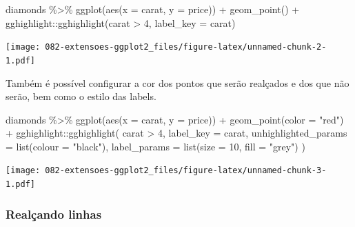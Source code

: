 \documentclass[
]{book}
\newenvironment{Shaded}{\begin{snugshade}}{\end{snugshade}}
\newcommand{\AttributeTok}[1]{\textcolor[rgb]{0.77,0.63,0.00}{#1}}
\newcommand{\DecValTok}[1]{\textcolor[rgb]{0.00,0.00,0.81}{#1}}
\newcommand{\FunctionTok}[1]{\textcolor[rgb]{0.00,0.00,0.00}{#1}}
\newcommand{\NormalTok}[1]{#1}
\newcommand{\SpecialCharTok}[1]{\textcolor[rgb]{0.00,0.00,0.00}{#1}}
\newcommand{\StringTok}[1]{\textcolor[rgb]{0.31,0.60,0.02}{#1}}
\begin{document}
\begin{Shaded}
\begin{Highlighting}[]
\NormalTok{diamonds }\SpecialCharTok{\%\textgreater{}\%} 
  \FunctionTok{ggplot}\NormalTok{(}\FunctionTok{aes}\NormalTok{(}\AttributeTok{x =}\NormalTok{ carat, }\AttributeTok{y =}\NormalTok{ price)) }\SpecialCharTok{+}
  \FunctionTok{geom\_point}\NormalTok{() }\SpecialCharTok{+}
\NormalTok{  gghighlight}\SpecialCharTok{::}\FunctionTok{gghighlight}\NormalTok{(carat }\SpecialCharTok{\textgreater{}} \DecValTok{4}\NormalTok{, }\AttributeTok{label\_key =}\NormalTok{ carat)}
\end{Highlighting}
\end{Shaded}

\texttt{[image: 082-extensoes-ggplot2\_files/figure-latex/unnamed-chunk-2-1.pdf]}

Também é possível configurar a cor dos pontos que serão realçados e dos que não serão, bem como o estilo das labels.

\begin{Shaded}
\begin{Highlighting}[]
\NormalTok{diamonds }\SpecialCharTok{\%\textgreater{}\%} 
  \FunctionTok{ggplot}\NormalTok{(}\FunctionTok{aes}\NormalTok{(}\AttributeTok{x =}\NormalTok{ carat, }\AttributeTok{y =}\NormalTok{ price)) }\SpecialCharTok{+}
  \FunctionTok{geom\_point}\NormalTok{(}\AttributeTok{color =} \StringTok{"red"}\NormalTok{) }\SpecialCharTok{+}
\NormalTok{  gghighlight}\SpecialCharTok{::}\FunctionTok{gghighlight}\NormalTok{(}
\NormalTok{    carat }\SpecialCharTok{\textgreater{}} \DecValTok{4}\NormalTok{, }
    \AttributeTok{label\_key =}\NormalTok{ carat,}
    \AttributeTok{unhighlighted\_params =} \FunctionTok{list}\NormalTok{(}\AttributeTok{colour =} \StringTok{"black"}\NormalTok{),}
    \AttributeTok{label\_params =} \FunctionTok{list}\NormalTok{(}\AttributeTok{size =} \DecValTok{10}\NormalTok{, }\AttributeTok{fill =} \StringTok{"grey"}\NormalTok{)}
\NormalTok{  )}
\end{Highlighting}
\end{Shaded}

\texttt{[image: 082-extensoes-ggplot2\_files/figure-latex/unnamed-chunk-3-1.pdf]}

\hypertarget{realuxe7ando-linhas}{%
\subsubsection*{Realçando linhas}\label{realuxe7ando-linhas}}
\end{document}
